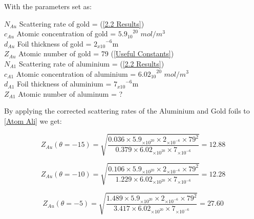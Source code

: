 \documentclass[12pt]{article}
\begin{document}
With the parameters set as:
\begin{multicols}{2}
    $N_{Au}$ \hspace{0.1cm} Scattering rate of gold = (\cref{2.2 Results})\\
    $c_{Au}$ \hspace{0.1cm} Atomic concentration of gold = ${5.9_{10}}^{20}$ $mol/m^3$\\
    $d_{Au}$ \hspace{0.1cm} Foil thickness of gold = ${2_{x10}}^{-6}$m \cite{Exp.6-2019} \\
    $Z_{Au}$ \hspace{0.1cm} Atomic number of gold = 79 (\cref{Useful Constants})\\
    $N_{A1}$ \hspace{0.1cm} Scattering rate of aluminium = (\cref{2.2 Results}) \\
    $c_{A1}$ \hspace{0.1cm} Atomic concentration of aluminium = ${6.02_{10}}^{20}$ $mol/m^3$ \\
    $d_{A1}$ \hspace{0.1cm} Foil thickness of aluminium = ${7_{x10}}^{-6}$m \cite{Exp.6-2019} \\
    $Z_{A1}$ \hspace{0.1cm} Atomic number of aluminum = ? 
\end{multicols}
\vspace{0.5cm}

By applying the corrected scattering rates of the Aluminium and Gold foils to \cref{Atom Ali} we get:

\begin{equation}
{Z_{Au}} (\theta = -15) = \sqrt{\dfrac{0.036 \times 5.9_{\times10^{20}} \times 2_{\times10^{-6}} \times 79^2}{0.379 \times 6.02_{\times10^{20}} \times 7_{\times10^{-6}}}} = 12.88
\end{equation} 

\begin{equation}
{Z_{Au}} (\theta = -10) = \sqrt{\dfrac{0.106 \times 5.9_{\times10^{20}} \times 2_{\times10^{-6}} \times 79^2}{1.229 \times 6.02_{\times10^{20}} \times 7_{\times10^{-6}}}} = 12.28
\end{equation} 

\begin{equation}
{Z_{Au}} (\theta = -5) = \sqrt{\dfrac{1.489 \times 5.9_{\times10^{20}} \times 2_{\times10^{-6}} \times 79^2}{3.417 \times 6.02_{\times10^{20}} \times 7_{\times10^{-6}}}} = 27.60
\end{equation} 
\end{document}
